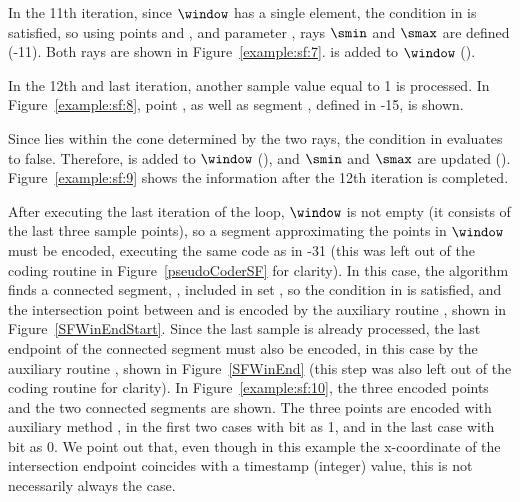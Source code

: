 

\clearpage


In the 11th iteration, since $\window$ has a single element, the condition in  is satisfied, so using points \snapshot and , and parameter \maxerror, rays $\smin$ and $\smax$ are defined (-11). Both rays are shown in Figure~\ref{example:sf:7}.  is added to $\window$ (). 


\vspace{+5pt}


In the 12th and last iteration, another sample value equal to 1 is processed. In Figure~\ref{example:sf:8}, point , as well as segment , defined in -15, is shown.


\vspace{+5pt}


\clearpage


Since  lies within the cone determined by the two rays, the condition in  evaluates to false. Therefore,  is added to $\window$ (), and $\smin$ and $\smax$ are updated (). Figure~\ref{example:sf:9}  shows the information after the 12th iteration is completed.




After executing the last iteration of the loop, $\window$ is not empty (it consists of the last three sample points), so a segment approximating the points in $\window$ must be encoded, executing the same code as in -31 (this was left out of the coding routine in Figure~\ref{pseudoCoderSF} for clarity). In this case, the algorithm finds a connected segment, \segmentConnT, included in set \segmentSet, so the condition in  is satisfied, and the intersection point between \segmentLastT and \segmentConnT is encoded by the auxiliary routine \SFEncodeWinEndStart, shown in Figure~\ref{SFWinEndStart}. Since the last sample is already processed, the last endpoint of the connected segment must also be encoded, in this case by the auxiliary routine \SFWinEndP, shown in Figure~\ref{SFWinEnd} (this step was also left out of the coding routine for clarity). In Figure~\ref{example:sf:10}, the three encoded points and the two connected segments are shown. The three points are encoded with auxiliary method \SFEncodePoint, in the first two cases with bit \connectedS as 1, and in the last case with bit \connectedS as 0. We point out that, even though in this example the x-coordinate of the intersection endpoint coincides with a timestamp (integer) value, this is not necessarily always the case.


